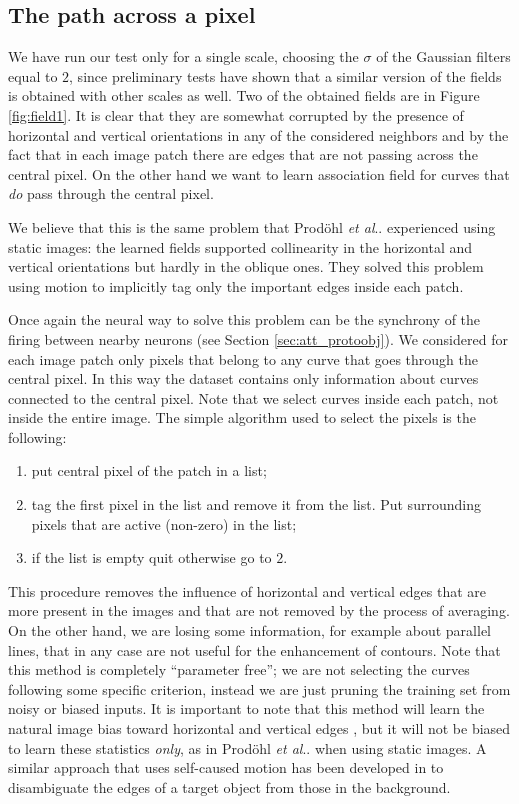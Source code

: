\documentclass{llncs}
\makeatletter
\DeclareRobustCommand\onedot{\futurelet\@let@token\@onedot}
\def\@onedot{\ifx\@let@token.\else.\null\fi\xspace}
\def\etal{\emph{et al}\onedot}
\makeatother
\begin{document}
\subsection{The path across a pixel}
\label{sec:ass_pre_res}
We have run our test only for a single scale, choosing the $\sigma$ of the
Gaussian filters equal to $2$, since preliminary tests have shown that a
similar version of the fields is obtained with other scales as well.
Two of the obtained fields are in Figure \ref{fig:field1}. It is clear that
they are somewhat corrupted by the presence of horizontal and vertical
orientations in any of the considered neighbors and by the fact that
in each image patch there are edges that are not passing across the central
pixel. On the other hand we want to learn association field for curves that \emph{do}
pass through the central pixel.

We believe that this is the same problem that Prod\"ohl \etal \cite{Prodohl01}
experienced using static images: the learned fields supported collinearity in
the horizontal and vertical orientations but hardly in the oblique ones. They
solved this problem using motion to implicitly tag only the important edges
inside each patch.

Once again the neural way to solve this problem can be the synchrony of the
firing between nearby neurons (see Section \ref{sec:att_protoobj}).
We considered for each image patch only pixels that belong to any
curve that goes through the central pixel. In this way the dataset 
contains only information about curves connected to the central pixel.
Note that we select curves inside each patch, not inside the entire image.
The simple algorithm used to select the pixels is the following:
\begin{enumerate}
	\item put central pixel of the patch in a list;
	\item tag the first pixel in the list and remove it from the list. Put surrounding pixels that are active (non-zero) in the list;
	\item if the list is empty quit otherwise go to $2$.
\end{enumerate}
This procedure removes the influence of horizontal and vertical edges that are
more present in the images and that are not removed by the process of
averaging. On the other hand, we are losing some information, for example about
parallel lines, that in any case are not useful for the enhancement of
contours.
Note that this method is completely ``parameter free''; we are not selecting
the curves following some specific criterion, instead we are just pruning the
training set from noisy or biased inputs.
It is important to note that this method will learn the natural image bias
toward horizontal and vertical edges \cite{CoppolaPMP98}, but it will not be
biased to learn these statistics \emph{only}, as in Prod\"ohl \etal
\cite{Prodohl01} when using static images.
A similar approach that uses self-caused motion has been developed in
\cite{Fitzpatrick03} to disambiguate the edges of a target object from those in
the background.
\end{document}
